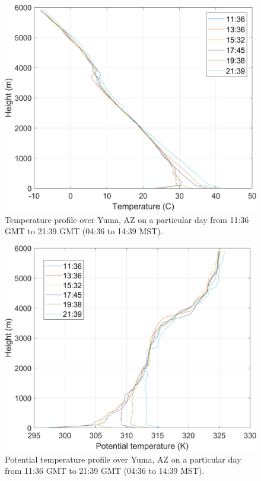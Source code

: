 \documentclass[11pt]{article}
\begin{document}
\begin{figure}[h!]
	\centering
	\includegraphics[width=\textwidth]{YumaTemp.png}
	\caption{Temperature profile over Yuma, AZ on a particular day from 11:36 GMT to 21:39 GMT (04:36 to 14:39 MST).}
	\label{fig:YumaT}
\end{figure}

\begin{figure}
	\centering
	\includegraphics[width=\textwidth]{YumaPotentialTemp.png}
	\caption{Potential temperature profile over Yuma, AZ on a particular day from 11:36 GMT to 21:39 GMT (04:36 to 14:39 MST).}
	\label{fig:YumaPotentialT}
\end{figure}
\end{document}
